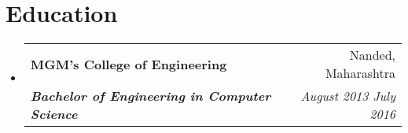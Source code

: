 \documentclass[letterpaper, 11pt]{article}
\makeatletter
\newcommand{\resumeSubheading}[4]{
  \vspace{-2pt}\item
    \begin{tabular*}{0.99\textwidth}[t]{l@{\extracolsep{\fill}}r}
      \textbf{#1} & #2 \\
      \textit{\small#3} & \textit{\small #4} \\
    \end{tabular*}\vspace{-7pt}
}
\newcommand{\resumeSubHeadingListStart}{\begin{itemize}[leftmargin=0.15in, label={}]}
\newcommand{\resumeSubHeadingListEnd}{\end{itemize}}
\makeatother
\begin{document}
\vspace{-17pt}

\section{Education}
\resumeSubHeadingListStart{}
    \resumeSubheading{MGM's \textendash{} College of Engineering}{Nanded, Maharashtra}
        {\textbf{Bachelor of Engineering in Computer Science}}{August 2013 \textendash{} July 2016}
\resumeSubHeadingListEnd{}

\end{document}
